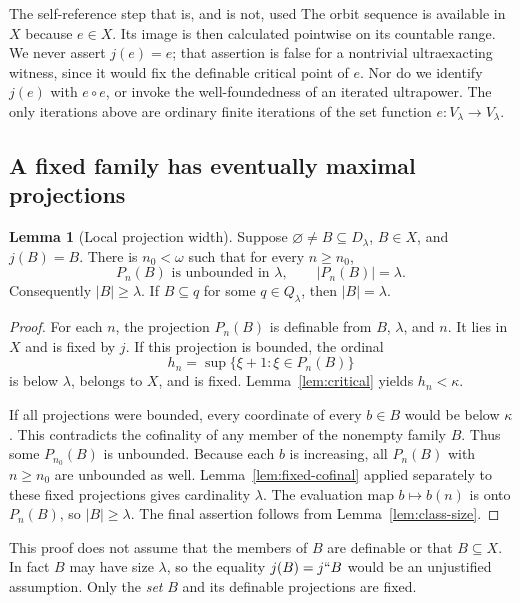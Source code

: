 \documentclass[11pt,letterpaper]{article}
\theoremstyle{definition}
\newtheorem{lemma}[definition]{Lemma}
\numberwithin{equation}{section}
\begin{document}
\begin{assessment}{The self-reference step that is, and is not, used}
The orbit sequence is available in $X$ because $e\in X$. Its image is then calculated pointwise on its countable range. We never assert $j(e)=e$; that assertion is false for a nontrivial ultraexacting witness, since it would fix the definable critical point of $e$. Nor do we identify $j(e)$ with $e\circ e$, or invoke the well-foundedness of an iterated ultrapower. The only iterations above are ordinary finite iterations of the set function $e:V_\lambda\to V_\lambda$.
\end{assessment}

\subsection{A fixed family has eventually maximal projections}

\begin{lemma}[Local projection width]\label{lem:local-width}
Suppose $\varnothing\ne B\subseteq D_\lambda$, $B\in X$, and $j(B)=B$. There is $n_0<\omega$ such that for every $n\ge n_0$,
\begin{equation}
P_n(B)\text{ is unbounded in }\lambda,
\qquad |P_n(B)|=\lambda.\label{eq:local-width}
\end{equation}
Consequently $|B|\ge\lambda$. If $B\subseteq q$ for some $q\in Q_\lambda$, then $|B|=\lambda$.
\end{lemma}
\begin{proof}
For each $n$, the projection $P_n(B)$ is definable from $B$, $\lambda$, and $n$. It lies in $X$ and is fixed by $j$. If this projection is bounded, the ordinal
\[
h_n=\sup\{\xi+1:\xi\in P_n(B)\}
\]
is below $\lambda$, belongs to $X$, and is fixed. Lemma~\ref{lem:critical} yields $h_n<\kappa$.

If all projections were bounded, every coordinate of every $b\in B$ would be below $\kappa$. This contradicts the cofinality of any member of the nonempty family $B$. Thus some $P_{n_0}(B)$ is unbounded. Because each $b$ is increasing, all $P_n(B)$ with $n\ge n_0$ are unbounded as well. Lemma~\ref{lem:fixed-cofinal} applied separately to these fixed projections gives cardinality $\lambda$. The evaluation map $b\mapsto b(n)$ is onto $P_n(B)$, so $|B|\ge\lambda$. The final assertion follows from Lemma~\ref{lem:class-size}.
\end{proof}

This proof does not assume that the members of $B$ are definable or that $B\subseteq X$. In fact $B$ may have size $\lambda$, so the equality $j(B)=j``B$ would be an unjustified assumption. Only the \emph{set} $B$ and its definable projections are fixed.
\end{document}
